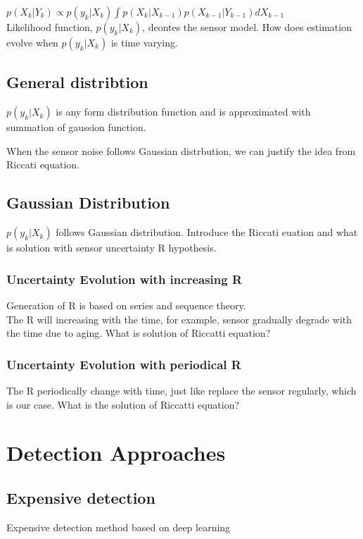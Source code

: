 \documentclass[12pt]{article}
\begin{document}
$p(X_{k}|Y_{k}) \propto p(y_{k}|X_{k}) \int p(X_{k}|X_{k-1})p(X_{k-1}|Y_{k-1}) dX_{k-1} $ \\

Likelihood function, $p(y_{k}|X_{k})$, deontes the sensor model.
How does estimation evolve when $p(y_{k}|X_{k})$ is time varying.

\subsection{General distribtion}
$p(y_{k}|X_{k})$ is any form distribution function and is approximated with summation of gaussion function. 

When the sensor noise follows Gaussian distrbution, we can justify the idea from Riccati equation.
\subsection{Gaussian Distribution}\label{Riccati_equation}
$p(y_{k}|X_{k})$ follows Gaussian distribution. Introduce the Riccati euation and what is solution with sensor uncertainty R hypothesis.

\subsubsection{Uncertainty Evolution with increasing R}
Generation of R is based on series and sequence theory.\\
The R will increasing with the time, for example, sensor gradually degrade with the time due to aging. What is solution of Riccatti equation?

\subsubsection{Uncertainty Evolution with periodical R}
The R periodically change with time, just like replace the sensor regularly, which is our case. What is the solution of Riccatti equation?


\section{Detection Approaches}\label{hybrid_method}

\subsection{Expensive detection}
Expensive detection method based on deep learning\cite{voxelnet}
\end{document}
